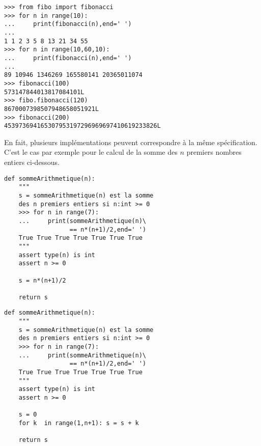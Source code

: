 \begin{py}{6cm}
\begin{verbatim}
>>> from fibo import fibonacci
>>> for n in range(10):
...     print(fibonacci(n),end=' ')
...
1 1 2 3 5 8 13 21 34 55
>>> for n in range(10,60,10):
...     print(fibonacci(n),end=' ')
...
89 10946 1346269 165580141 20365011074
>>> fibonacci(100)
573147844013817084101L
>>> fibo.fibonacci(120)
8670007398507948658051921L
>>> fibonacci(200)
453973694165307953197296969697410619233826L
\end{verbatim}
\end{py}
\mbox{}\hspace*{1cm}\vspace*{2mm}


\noindent En fait, plusieurs implémentations peuvent correspondre
à la même spécification. C'est le cas par exemple
pour le calcul de la somme des $n$ premiers nombres
entiers ci-dessous.

\noindent\mbox{}\hspace*{1cm}\begin{py}{6cm}
\begin{verbatim}
def sommeArithmetique(n):
    """
    s = sommeArithmetique(n) est la somme 
    des n premiers entiers si n:int >= 0
    >>> for n in range(7):
    ...     print(sommeArithmetique(n)\
                  == n*(n+1)/2,end=' ')
    True True True True True True True
    """
    assert type(n) is int
    assert n >= 0

    s = n*(n+1)/2
    
    return s
\end{verbatim}
\end{py}\hfill
\begin{py}{6cm}
\begin{verbatim}
def sommeArithmetique(n):
    """
    s = sommeArithmetique(n) est la somme 
    des n premiers entiers si n:int >= 0
    >>> for n in range(7):
    ...     print(sommeArithmetique(n)\
                  == n*(n+1)/2,end=' ')
    True True True True True True True
    """
    assert type(n) is int
    assert n >= 0

    s = 0
    for k  in range(1,n+1): s = s + k
    
    return s
\end{verbatim}
\end{py}
\hspace*{1cm}\mbox{}\vspace*{2mm}

